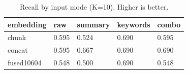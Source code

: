 \begin{table}
\caption{Recall by input mode (K=10). Higher is better.}
\label{tab:recall-by-mode}
\begin{tabular}{lllll}
\toprule
embedding & raw & summary & keywords & combo \\
\midrule
chunk & 0.595 & 0.524 & 0.690 & 0.595 \\
concat & 0.595 & 0.667 & 0.690 & 0.690 \\
fused10604 & 0.548 & 0.500 & 0.690 & 0.548 \\
\bottomrule
\end{tabular}
\end{table}
